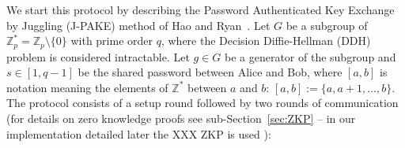 We start this protocol by describing the Password Authenticated Key Exchange by Juggling (J-PAKE) method
of Hao and Ryan~\cite{HaRy2010}.  Let $G$ be a subgroup of $\mathbb{Z}_p^* = \mathbb{Z}_p \setminus \{0\}$ 
with prime order $q$, where the Decision Diffie-Hellman (DDH) problem is considered intractable.  Let $g\in G$
be a generator of the subgroup and $s \in [1,q-1]$ be the shared password between Alice and Bob, where 
$[a,b]$ is notation meaning the elements of $\mathbb{Z}^*$ between $a$ and $b$:  $[a,b] := \{a,a+1,\dots,b \}$.
\\

The protocol consists of a setup round followed by two rounds of communication (for details on zero knowledge
proofs see sub-Section~\ref{sec:ZKP} -- in our implementation detailed later the XXX ZKP is used ):
\begin{figure}[h]
\end{figure}
